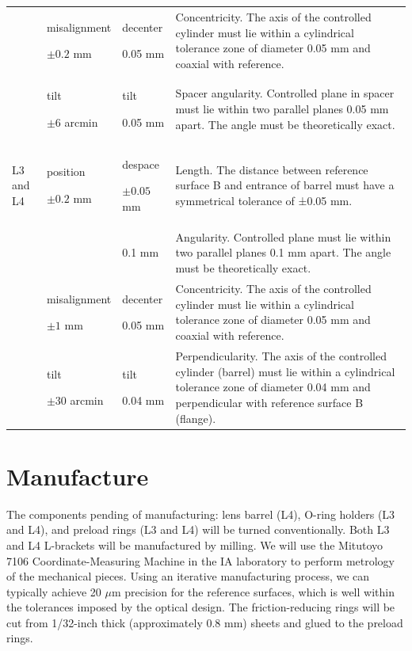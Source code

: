 \documentclass{report}
\begin{document}
\begin{table}
\begin{center}
\begin{tabular}{lp{2cm}p{2cm}p{6cm}}
&misalignment\par$\pm0.2$ mm&decenter\par0.05 mm&
Concentricity. The axis of the controlled cylinder must lie within a cylindrical tolerance zone of diameter 0.05 mm and coaxial with reference.\\
&tilt\par$\pm6$ arcmin&tilt\par0.05 mm&
Spacer angularity. Controlled plane in spacer must lie within two parallel planes 0.05 mm apart. The angle must be theoretically exact.\\
\hline
L3 and L4											
&position\par$\pm0.2$ mm&despace\par$\pm0.05$ mm&
Length. The distance between reference surface B and entrance of barrel must have a symmetrical tolerance of ±0.05 mm.\\
&&0.1 mm&
Angularity. Controlled plane must lie within two parallel planes 0.1 mm apart. The angle must be theoretically exact.\\
&misalignment\par$\pm1$ mm&decenter\par0.05 mm&
Concentricity. The axis of the controlled cylinder must lie within a cylindrical tolerance zone of diameter 0.05 mm and coaxial with reference.\\	
&tilt\par$\pm30$ arcmin&tilt\par0.04 mm&
Perpendicularity. The axis of the controlled cylinder (barrel) must lie within a cylindrical tolerance zone of diameter 0.04 mm and perpendicular with reference surface B (flange).\\
\hline
\end{tabular}
\end{center}
\end{table}

\section{Manufacture}

The components pending of manufacturing: lens barrel (L4), O-ring holders (L3 and L4), and preload rings (L3 and L4) will be turned conventionally. Both L3 and L4 L-brackets will be manufactured by milling.
We will use the Mitutoyo 7106 Coordinate-Measuring Machine in the IA laboratory to perform metrology of the mechanical pieces. Using an iterative manufacturing process, we can typically achieve 20 $\mu$m precision for the reference surfaces, which is well within the tolerances imposed by the optical design.
The friction-reducing rings will be cut from 1/32-inch thick (approximately 0.8 mm) sheets and glued to the preload rings.
\end{document}
